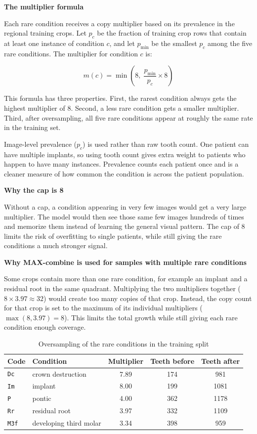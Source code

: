 \documentclass[a4paper,12pt]{report}
\newcommand{\minisection}[1]{%
  \vspace{1ex}
  \noindent\textbf{#1}\par
  \vspace{0.5ex}
}
\begin{document}
\minisection{The multiplier formula}

Each rare condition receives a copy multiplier based on its prevalence in the regional training crops. Let $p_c$ be the fraction of training crop rows that contain at least one instance of condition $c$, and let $p_{\min}$ be the smallest $p_c$ among the five rare conditions. The multiplier for condition $c$ is:

\begin{equation}
m(c) = \min\!\left(8,\; \frac{p_{\min}}{p_c} \times 8\right)
\label{eq:multiplier}
\end{equation}

This formula has three properties. First, the rarest condition always gets the highest multiplier of 8. Second, a less rare condition gets a smaller multiplier. Third, after oversampling, all five rare conditions appear at roughly the same rate in the training set.

Image-level prevalence ($p_c$) is used rather than raw tooth count. One patient can have multiple implants, so using tooth count gives extra weight to patients who happen to have many instances. Prevalence counts each patient once and is a cleaner measure of how common the condition is across the patient population.

\minisection{Why the cap is 8}

Without a cap, a condition appearing in very few images would get a very large multiplier. The model would then see those same few images hundreds of times and memorize them instead of learning the general visual pattern. The cap of 8 limits the risk of overfitting to single patients, while still giving the rare conditions a much stronger signal.

\minisection{Why MAX-combine is used for samples with multiple rare conditions}

Some crops contain more than one rare condition, for example an implant and a residual root in the same quadrant. Multiplying the two multipliers together ($8 \times 3.97 \approx 32$) would create too many copies of that crop. Instead, the copy count for that crop is set to the maximum of its individual multipliers ($\max(8, 3.97) = 8$). This limits the total growth while still giving each rare condition enough coverage.

\begin{table}[H]
\centering
\caption{Oversampling of the rare conditions in the training split}
\begin{tabular}{llccc}
\toprule
Code & Condition & Multiplier & Teeth before & Teeth after \\
\midrule
\texttt{Dc}  & crown destruction      & 7.89 & 174 & 981 \\
\texttt{Im}  & implant                & 8.00 & 199 & 1081 \\
\texttt{P}   & pontic                 & 4.00 & 362 & 1178 \\
\texttt{Rr}  & residual root          & 3.97 & 332 & 1109 \\
\texttt{M3f} & developing third molar & 3.34 & 398 & 959 \\
\bottomrule
\end{tabular}
\end{table}
\end{document}
